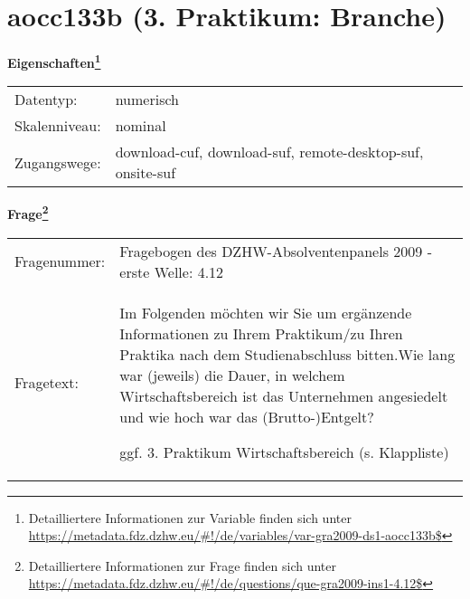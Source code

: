 
    \setcounter{footnote}{0}

    \vspace*{-1.8cm}
	\section{aocc133b (3. Praktikum: Branche)}
	\label{section:aocc133b}



    \vspace*{0.5cm}
    \noindent\textbf{Eigenschaften\footnote{Detailliertere Informationen zur Variable finden sich unter
		\url{https://metadata.fdz.dzhw.eu/\#!/de/variables/var-gra2009-ds1-aocc133b$}}}\\
	\begin{tabularx}{\hsize}{@{}lX}
	Datentyp: & numerisch \\
	Skalenniveau: & nominal \\
	Zugangswege: &
	  download-cuf, 
	  download-suf, 
	  remote-desktop-suf, 
	  onsite-suf
 \\
    \end{tabularx}



				\vspace*{0.5cm}
                \noindent\textbf{Frage\footnote{Detailliertere Informationen zur Frage finden sich unter
		              \url{https://metadata.fdz.dzhw.eu/\#!/de/questions/que-gra2009-ins1-4.12$}}}\\
				\begin{tabularx}{\hsize}{@{}lX}
					Fragenummer: &
					  Fragebogen des DZHW-Absolventenpanels 2009 - erste Welle:
					  4.12
 \\
					Fragetext: & Im Folgenden möchten wir Sie um ergänzende Informationen zu Ihrem Praktikum/zu Ihren Praktika nach dem Studienabschluss bitten.Wie lang war (jeweils) die Dauer, in welchem Wirtschaftsbereich ist das Unternehmen angesiedelt und wie hoch war das (Brutto-)Entgelt?\par  ggf. 3. Praktikum Wirtschaftsbereich (s. Klappliste) \\
				\end{tabularx}





